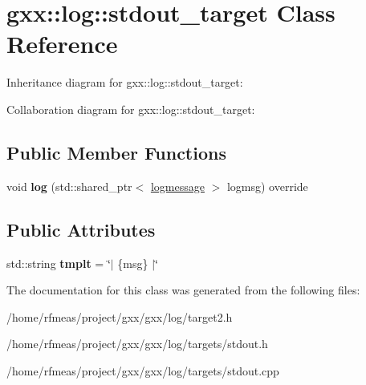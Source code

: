 \hypertarget{structgxx_1_1log_1_1stdout__target}{}\section{gxx\+:\+:log\+:\+:stdout\+\_\+target Class Reference}
\label{structgxx_1_1log_1_1stdout__target}


Inheritance diagram for gxx\+:\+:log\+:\+:stdout\+\_\+target\+:


Collaboration diagram for gxx\+:\+:log\+:\+:stdout\+\_\+target\+:
\subsection*{Public Member Functions}
\begin{DoxyCompactItemize}
\item 
void {\bfseries log} (std\+::shared\+\_\+ptr$<$ \hyperlink{structgxx_1_1log_1_1logmessage}{logmessage} $>$ logmsg) override\hypertarget{structgxx_1_1log_1_1stdout__target_a3d8162419a9c551c2813cd37dc8a0a4b}{}\label{structgxx_1_1log_1_1stdout__target_a3d8162419a9c551c2813cd37dc8a0a4b}

\end{DoxyCompactItemize}
\subsection*{Public Attributes}
\begin{DoxyCompactItemize}
\item 
std\+::string {\bfseries tmplt} = \char`\"{}$\vert$ \{msg\} $\vert$\char`\"{}\hypertarget{structgxx_1_1log_1_1stdout__target_ad882c5358208de693c37bc920bef95c8}{}\label{structgxx_1_1log_1_1stdout__target_ad882c5358208de693c37bc920bef95c8}

\end{DoxyCompactItemize}


The documentation for this class was generated from the following files\+:\begin{DoxyCompactItemize}
\item 
/home/rfmeas/project/gxx/gxx/log/target2.\+h\item 
/home/rfmeas/project/gxx/gxx/log/targets/stdout.\+h\item 
/home/rfmeas/project/gxx/gxx/log/targets/stdout.\+cpp\end{DoxyCompactItemize}
